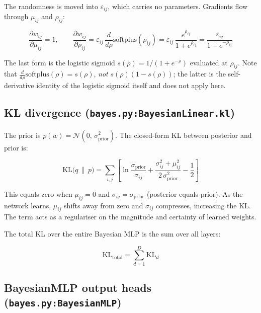 \documentclass[11pt,a4paper]{article}
\newcommand{\softplus}{\mathrm{softplus}}
\newcommand{\code}[1]{\texttt{#1}}
\begin{document}
The randomness is moved into $\varepsilon_{ij}$, which carries no parameters.
Gradients flow through $\mu_{ij}$ and $\rho_{ij}$:

\begin{equation}
\frac{\partial w_{ij}}{\partial \mu_{ij}} = 1,
\qquad
\frac{\partial w_{ij}}{\partial \rho_{ij}}
= \varepsilon_{ij}\,\frac{d}{d\rho}\softplus(\rho_{ij})
= \varepsilon_{ij}\,\frac{e^{\rho_{ij}}}{1 + e^{\rho_{ij}}}
= \frac{\varepsilon_{ij}}{1 + e^{-\rho_{ij}}}
\end{equation}

The last form is the logistic sigmoid $s(\rho) = 1/(1+e^{-\rho})$ evaluated at $\rho_{ij}$.
Note that $\frac{d}{d\rho}\softplus(\rho) = s(\rho)$, \emph{not} $s(\rho)(1-s(\rho))$;
the latter is the self-derivative identity of the logistic sigmoid itself and does not apply here.

\subsection{KL divergence (\code{bayes.py:BayesianLinear.kl})}

The prior is $p(w) = \mathcal{N}(0,\, \sigma_{\mathrm{prior}}^2)$.
The closed-form KL between posterior and prior is:

\begin{equation}
\mathrm{KL}\!\bigl(q \,\|\, p\bigr)
= \sum_{i,j}
  \left[
    \ln\frac{\sigma_{\mathrm{prior}}}{\sigma_{ij}}
    + \frac{\sigma_{ij}^2 + \mu_{ij}^2}{2\,\sigma_{\mathrm{prior}}^2}
    - \frac{1}{2}
  \right]
\label{eq:kl}
\end{equation}

This equals zero when $\mu_{ij}=0$ and $\sigma_{ij}=\sigma_{\mathrm{prior}}$ (posterior
equals prior).  As the network learns, $\mu_{ij}$ shifts away from zero and
$\sigma_{ij}$ compresses, increasing the KL.  The term acts as a regulariser on
the magnitude and certainty of learned weights.

The total KL over the entire Bayesian MLP is the sum over all layers:

\begin{equation}
\mathrm{KL}_{\mathrm{total}} = \sum_{d=1}^{D} \mathrm{KL}_d
\end{equation}

\subsection{BayesianMLP output heads (\code{bayes.py:BayesianMLP})}
\end{document}
